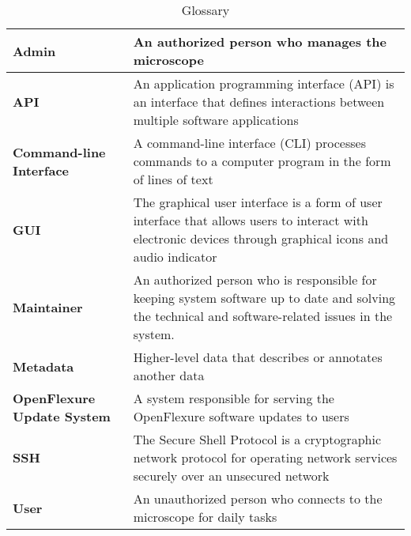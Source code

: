 \begin{table}[H]
     \centering
     \begin{tabular}{|l|p{7cm}|}
         \hline
\textbf{Admin} &
An authorized person who manages the microscope\\
\hline
\textbf{API} &
An application programming interface (API) is an interface that defines interactions between multiple software applications \\
\hline
\textbf{Command-line Interface} &
A command-line interface (CLI) processes commands to a computer program in the form of lines of text \\
\hline
\textbf{GUI} &
The graphical user interface is a form of user interface that allows users to interact with electronic devices through graphical icons and audio indicator \\
\hline
\textbf{Maintainer} & An authorized person who is responsible for keeping system software up to date and solving the technical and software-related issues in the system. \\
\hline
\textbf{Metadata} & Higher-level data that describes or annotates another data \\
\hline
\textbf{OpenFlexure Update System} & A system responsible for serving the OpenFlexure software updates to users \\
\hline
\textbf{SSH} & The Secure Shell Protocol is a cryptographic network protocol for operating network services securely over an unsecured network \\
\hline
\textbf{User} &  An unauthorized person who connects to the microscope for daily tasks\\
\hline
     \end{tabular}
     \caption{Glossary}
     \label{tab:glossary}
 \end{table}